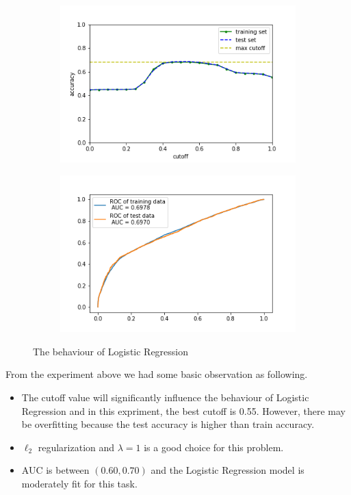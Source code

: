 \documentclass[a4paper,11pt,onecolumn,twoside]{article}
\begin{document}
\begin{figure}[htbp]
	\centering
	\begin{subfigure}[t]{0.45\textwidth}
		\includegraphics[width=1.0\textwidth]{logistic_cutoff.png}
	\end{subfigure}
	\quad
	\begin{subfigure}[t]{0.45\textwidth}
		\includegraphics[width=1.0\textwidth]{logistic_ROC.png}
	\end{subfigure}
\caption{The behaviour of Logistic Regression}
\end{figure}
\par
From the experiment above we had some basic observation as following.
\begin{itemize}
	\item The cutoff value will significantly influence the behaviour of Logistic Regression and in this expriment, the best cutoff is 0.55. However, there may be overfitting because the test accuracy is higher than train accuracy. 
	\item $\ell_2$ regularization and $\lambda=1$ is a good choice for this problem.
	\item AUC is between $(0.60, 0.70)$ and the Logistic Regression model is moderately fit for this task.
\end{itemize}
\end{document}
